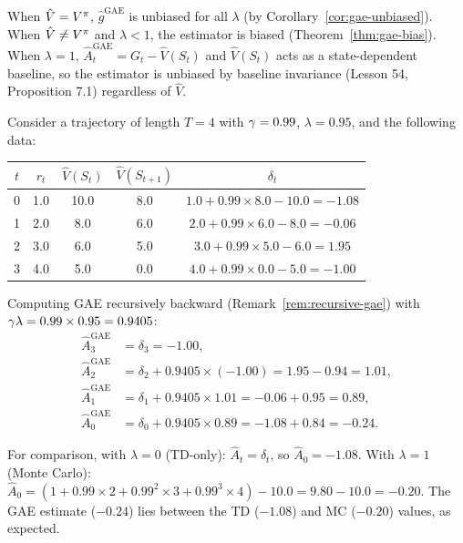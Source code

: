 \documentclass[11pt,a4paper]{article}
\begin{document}
\begin{proposition}
\label{prop:gae-pg-bias}
When $\hat{V} = V^{\pi}$, $\hat{g}^{\mathrm{GAE}}$ is unbiased for all
$\lambda$ (by Corollary~\ref{cor:gae-unbiased}). When $\hat{V} \neq
V^{\pi}$ and $\lambda < 1$, the estimator is biased
(Theorem~\ref{thm:gae-bias}). When $\lambda = 1$,
$\hat{A}_t^{\mathrm{GAE}} = G_t - \hat{V}(S_t)$ and $\hat{V}(S_t)$
acts as a state-dependent baseline, so the estimator is unbiased by
baseline invariance (Lesson 54, Proposition 7.1) regardless of $\hat{V}$.
\end{proposition}

\begin{example}
\label{ex:gae-computation}
Consider a trajectory of length $T = 4$ with $\gamma = 0.99$,
$\lambda = 0.95$, and the following data:
\begin{center}
\begin{tabular}{ccccc}
\toprule
$t$ & $r_t$ & $\hat{V}(S_t)$ & $\hat{V}(S_{t+1})$ & $\delta_t$ \\
\midrule
0 & 1.0 & 10.0 & 8.0 & $1.0 + 0.99 \times 8.0 - 10.0 = -1.08$ \\
1 & 2.0 & 8.0 & 6.0 & $2.0 + 0.99 \times 6.0 - 8.0 = -0.06$ \\
2 & 3.0 & 6.0 & 5.0 & $3.0 + 0.99 \times 5.0 - 6.0 = 1.95$ \\
3 & 4.0 & 5.0 & 0.0 & $4.0 + 0.99 \times 0.0 - 5.0 = -1.00$ \\
\bottomrule
\end{tabular}
\end{center}

Computing GAE recursively backward (Remark~\ref{rem:recursive-gae})
with $\gamma\lambda = 0.99 \times 0.95 = 0.9405$:
\begin{align*}
  \hat{A}_3^{\mathrm{GAE}} &= \delta_3 = -1.00, \\
  \hat{A}_2^{\mathrm{GAE}} &= \delta_2 + 0.9405 \times (-1.00)
    = 1.95 - 0.94 = 1.01, \\
  \hat{A}_1^{\mathrm{GAE}} &= \delta_1 + 0.9405 \times 1.01
    = -0.06 + 0.95 = 0.89, \\
  \hat{A}_0^{\mathrm{GAE}} &= \delta_0 + 0.9405 \times 0.89
    = -1.08 + 0.84 = -0.24.
\end{align*}

For comparison, with $\lambda = 0$ (TD-only): $\hat{A}_t = \delta_t$,
so $\hat{A}_0 = -1.08$. With $\lambda = 1$ (Monte Carlo):
$\hat{A}_0 = (1 + 0.99 \times 2 + 0.99^2 \times 3 + 0.99^3 \times 4)
- 10.0 = 9.80 - 10.0 = -0.20$. The GAE estimate ($-0.24$) lies between
the TD ($-1.08$) and MC ($-0.20$) values, as expected.
\end{example}
\end{document}
